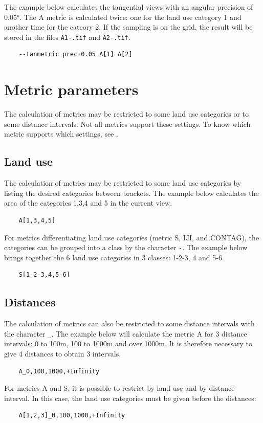 \documentclass{report}
\begin{document}
The example below calculates the tangential views with an angular precision of 0.05°. The A metric is calculated twice: one for the land use category 1 and another time for the cateory 2. If the sampling is on the grid, the result will be stored in the files \verb|A1-.tif| and \verb|A2-.tif|.
\begin{Verbatim}
	--tanmetric prec=0.05 A[1] A[2]
\end{Verbatim}


\section{Metric parameters}
\label{param_metrics_cli}
The calculation of metrics may be restricted to some land use categories or to some distance intervals. Not all metrics support these settings. To know which metric supports which settings, see .

\subsection{Land use}
The calculation of metrics may be restricted to some land use categories by listing the desired categories between brackets. The example below calculates the area of the categories 1,3,4 and 5 in the current view.
\begin{Verbatim}
	A[1,3,4,5]
\end{Verbatim}

For metrics differentiating land use categories (metric S, IJI, and CONTAG), the categories can be grouped into a class by the character \verb|-|. 
The example below brings together the 6 land use categories in 3 classes: 1-2-3, 4 and 5-6.
\begin{Verbatim}
	S[1-2-3,4,5-6]
\end{Verbatim}

\subsection{Distances}
The calculation of metrics can also be restricted to some distance intervals with the character \verb|_|. The example below will calculate the metric A for 3 distance intervals: 0 to 100m, 100 to 1000m and over 1000m. It is therefore necessary to give 4 distances to obtain 3 intervals.
\begin{Verbatim}
	A_0,100,1000,+Infinity
\end{Verbatim}

For metrics A and S, it is possible to restrict by land use and by distance interval. In this case, the land use categories must be given before the distances:
\begin{Verbatim}
	A[1,2,3]_0,100,1000,+Infinity
\end{Verbatim}
\end{document}
